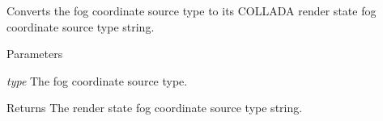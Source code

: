 \label{namespaceFUDaePassStateFogCoordinateType_aa9bf626bbb748bec31c5d4c39a0965ba}
Converts the fog coordinate source type to its COLLADA render state fog coordinate source type string. 
\begin{DoxyParams}{Parameters}
\item[{\em type}]The fog coordinate source type. \end{DoxyParams}
\begin{DoxyReturn}{Returns}
The render state fog coordinate source type string. 
\end{DoxyReturn}
